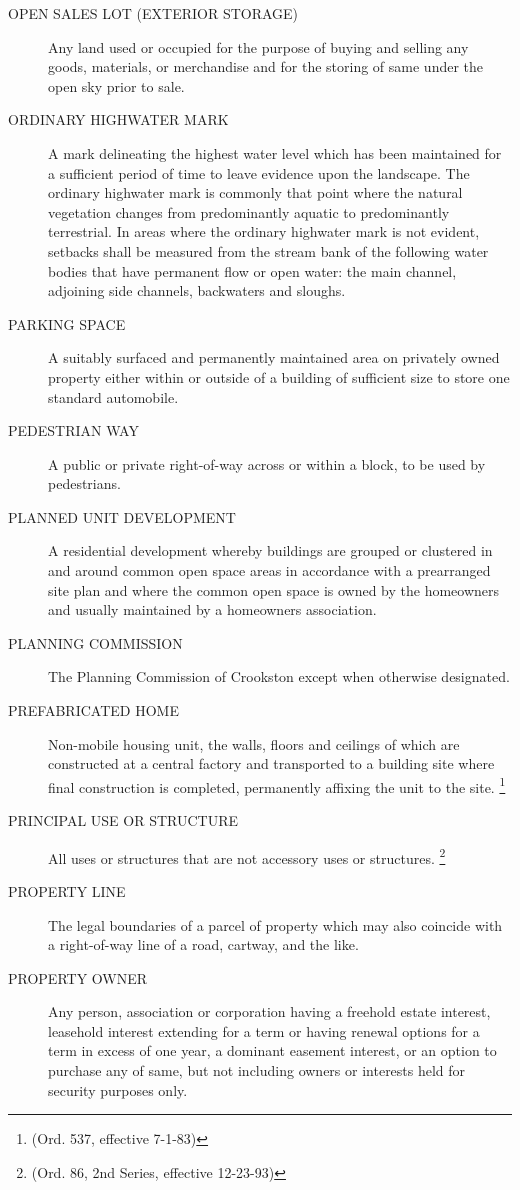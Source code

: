 \begin{description}
    \item[OPEN SALES LOT (EXTERIOR STORAGE)] Any land used or occupied for the purpose of buying and selling any goods, materials, or merchandise and for the storing of same under the open sky prior to sale.
    \item[ORDINARY HIGHWATER MARK] A mark delineating the highest water level which has been maintained for a sufficient period of time to leave evidence upon the landscape. The ordinary highwater mark is commonly that point where the natural vegetation changes from predominantly aquatic to predominantly terrestrial. In areas where the ordinary highwater mark is not evident, setbacks shall be measured from the stream bank of the following water bodies that have permanent flow or open water: the main channel, adjoining side channels, backwaters and sloughs.
    \item[PARKING SPACE] A suitably surfaced and permanently maintained area on privately owned property either within or outside of a building of sufficient size to store one standard automobile.
    \item[PEDESTRIAN WAY] A public or private right-of-way across or within a block, to be used by pedestrians.
    \item[PLANNED UNIT DEVELOPMENT] A residential development whereby buildings are grouped or clustered in and around common open space areas in accordance with a prearranged site plan and where the common open space is owned by the homeowners and usually maintained by a homeowners association.
    \item[PLANNING COMMISSION] The Planning Commission of Crookston except when otherwise designated.
    \item[PREFABRICATED HOME] Non-mobile housing unit, the walls, floors and ceilings of which are constructed at a central factory and transported to a building site where final construction is completed, permanently affixing the unit to the site. \footnote{(Ord. 537, effective 7-1-83)}
    \item[PRINCIPAL USE OR STRUCTURE] All uses or structures that are not accessory uses or structures. \footnote{(Ord. 86, 2nd Series, effective 12-23-93)}
    \item[PROPERTY LINE] The legal boundaries of a parcel of property which may also coincide with a right-of-way line of a road, cartway, and the like.
    \item[PROPERTY OWNER] Any person, association or corporation having a freehold estate interest, leasehold interest extending for a term or having renewal options for a term in excess of one year, a dominant easement interest, or an option to purchase any of same, but not including owners or interests held for security purposes only.

\end{description}
